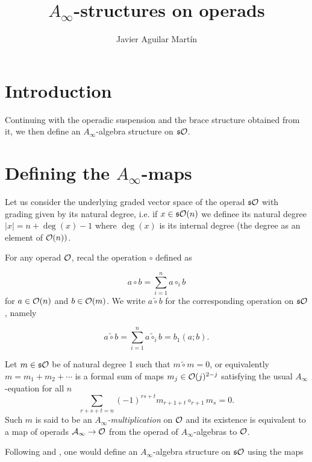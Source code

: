 \documentclass[twoside]{article}
\begin{document}
\title{$A_\infty$-structures on operads}
\author{Javier Aguilar Martín}
\maketitle

\section{Introduction}
Continuing with the operadic suspension and the brace structure obtained from it, we then define an $A_\infty$-algebra structure on $\mathfrak{s}{\mathcal O}$.


\section{Defining the $A_\infty$-maps}


Let us consider the underlying graded vector space of the operad $\mathfrak{s}{\mathcal O}$ with grading given by its natural degree, i.e. if $x\in \mathfrak{s}{\mathcal O}(n)$ we definee its natural degree $|x|=n+\deg(x)-1$ where $\deg(x)$ is its internal degree (the degree as an element of ${\mathcal O}(n))$. 

For any operad ${\mathcal O}$, recal the operation $\circ$ defined as

\[
a\circ b=\sum_{i=1}^n a\circ_i b
\]
for $a\in{\mathcal O}(n)$ and $b\in {\mathcal O}(m)$. We write $a\tilde{\circ}b$ for the corresponding operation on $\mathfrak{s}{\mathcal O}$, namely

\[
a\tilde{\circ} b=\sum_{i=1}^n a\tilde{\circ}_i b=b_1(a;b).
\]


Let $m\in\mathfrak{s}{\mathcal O}$ be of natural degree 1 such that $m\tilde{\circ}m=0$, or equivalently $m=m_1+m_2+\cdots$ is a formal sum of maps $m_j\in{\mathcal O}(j)^{2-j}$ satisfying the usual $A_\infty$-equation for all $n$
\begin{equation}\label{Ainftyeq}
\sum_{r+s+t=n}(-1)^{rs+t}m_{r+1+t}\circ_{r+1}m_s=0.
\end{equation} 
Such $m$ is said to be an \emph{$A_\infty$-multiplication} on ${\mathcal O}$ and its existence is equivalent to a map of operads $\mathcal{A}_\infty\to {\mathcal O}$ from the operad of $A_\infty$-algebras to ${\mathcal O}$. 

Following \cite{GV} and \cite{getzler}, one would define an $A_\infty$-algebra structure on $\mathfrak{s}{\mathcal O}$ using the maps 
\end{document}
